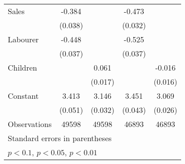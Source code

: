 {\begin{tabular}{l*{4}{c}}
Sales               &      -0.384\sym{***}&                     &      -0.473\sym{***}&                     \\
                    &     (0.038)         &                     &     (0.032)         &                     \\
Labourer            &      -0.448\sym{***}&                     &      -0.525\sym{***}&                     \\
                    &     (0.037)         &                     &     (0.037)         &                     \\
Children            &                     &       0.061\sym{***}&                     &      -0.016         \\
                    &                     &     (0.017)         &                     &     (0.016)         \\
Constant            &       3.413\sym{***}&       3.146\sym{***}&       3.451\sym{***}&       3.069\sym{***}\\
                    &     (0.051)         &     (0.032)         &     (0.043)         &     (0.026)         \\
\hline
Observations        &       49598         &       49598         &       46893         &       46893         \\
\hline\hline
\multicolumn{5}{l}{\footnotesize Standard errors in parentheses}\\
\multicolumn{5}{l}{\footnotesize \sym{*} \(p<0.1\), \sym{**} \(p<0.05\), \sym{***} \(p<0.01\)}\\
\end{tabular}
}
